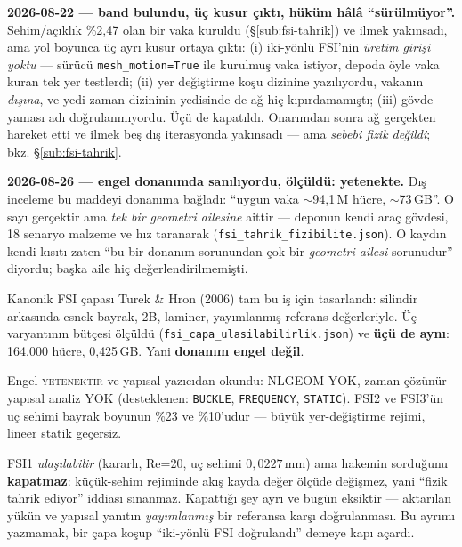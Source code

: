 \documentclass[11pt,a4paper]{article}
\begin{document}
\begin{description}
        \textbf{2026-08-22 --- band bulundu, üç kusur çıktı, hüküm hâlâ
        ``sürülmüyor''.} Sehim/açıklık \%2{,}47 olan bir vaka kuruldu
        (\S\ref{sub:fsi-tahrik}) ve ilmek yakınsadı, ama yol boyunca üç ayrı
        kusur ortaya çıktı: (i) iki-yönlü FSI'nin \emph{üretim girişi yoktu} ---
        sürücü \texttt{mesh\_motion=True} ile kurulmuş vaka istiyor, depoda
        öyle vaka kuran tek yer testlerdi; (ii) yer değiştirme koşu dizinine
        yazılıyordu, vakanın \emph{dışına}, ve yedi zaman dizininin yedisinde
        de ağ hiç kıpırdamamıştı; (iii) gövde yaması adı doğrulanmıyordu.
        Üçü de kapatıldı. Onarımdan sonra ağ gerçekten hareket etti ve ilmek
        beş dış iterasyonda yakınsadı --- ama \emph{sebebi fizik değildi};
        bkz. \S\ref{sub:fsi-tahrik}.

        \textbf{2026-08-26 --- engel donanımda sanılıyordu, ölçüldü:
        yetenekte.} Dış inceleme bu maddeyi donanıma bağladı: ``uygun vaka
        $\sim$94,1\,M hücre, $\sim$73\,GB''. O sayı gerçektir ama
        \emph{tek bir geometri ailesine} aittir --- deponun kendi araç
        gövdesi, 18 senaryo malzeme ve hız taranarak
        (\texttt{fsi\_tahrik\_fizibilite.json}). O kaydın kendi kısıtı zaten
        ``bu bir donanım sorunundan çok bir \emph{geometri-ailesi} sorunudur''
        diyordu; başka aile hiç değerlendirilmemişti.

        Kanonik FSI çapası Turek \& Hron (2006) tam bu iş için tasarlandı:
        silindir arkasında esnek bayrak, 2B, laminer, yayımlanmış referans
        değerleriyle. Üç varyantının bütçesi ölçüldü
        (\texttt{fsi\_capa\_ulasilabilirlik.json}) ve \textbf{üçü de aynı}:
        164.000 hücre, 0{,}425\,GB. Yani
        \textbf{donanım engel değil}.

        Engel \textsc{yetenektir} ve yapısal yazıcıdan okundu: NLGEOM
        YOK, zaman-çözünür yapısal analiz YOK
        (desteklenen: \texttt{BUCKLE}, \texttt{FREQUENCY}, \texttt{STATIC}).
        FSI2 ve FSI3'ün uç sehimi bayrak boyunun \%23 ve \%10'udur --- büyük
        yer-değiştirme rejimi, lineer statik geçersiz.

        FSI1 \emph{ulaşılabilir} (kararlı, Re=20, uç sehimi
        $0{,}0227$\,mm) ama hakemin sorduğunu \textbf{kapatmaz}: küçük-sehim
        rejiminde akış kayda değer ölçüde değişmez, yani ``fizik tahrik
        ediyor'' iddiası sınanmaz. Kapattığı şey ayrı ve bugün eksiktir ---
        aktarılan yükün ve yapısal yanıtın \emph{yayımlanmış} bir referansa
        karşı doğrulanması. Bu ayrımı yazmamak, bir çapa koşup ``iki-yönlü
        FSI doğrulandı'' demeye kapı açardı.


\end{description}
\end{document}
